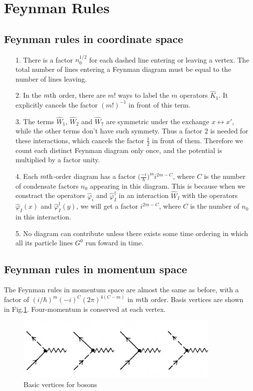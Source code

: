 \documentclass[12pt]{article}
\begin{document}
\noindent\hrulefill
\section{Feynman Rules}

\subsection*{Feynman rules in coordinate space}
\begin{itemize}
    \item[1.]There is a factor $n_0^{1/2}$ for each dashed line entering or leaving 
    a vertex. The total number of lines entering a Feynman diagram must be equal to 
    the number of lines leaving. 
    \item[2.]In the $m\rm th$ order, there are $m!$ ways to label the $m$ operators 
    $\hat{K}_1$. It explicitly cancels the factor $(m!)^{-1}$ in front of this term.
    \item[3.]The terms $\hat{W}_1$, $\hat{W}_2$ and $\hat{W}_7$ are symmetric under the 
    exchange $x\leftrightarrow x'$, while the other terms don't have such symmety. 
    Thus a factor $2$ is needed for these interactions, which cancels the factor 
    $\frac{1}{2}$ in front of them. Therefore we count each distinct Feynman diagram 
    only once, and the potential is multiplied by a factor unity.
    \item[4.]Each $m\rm th$-order diagram has a factor 
    $\big(\frac{-i}{\hbar}\big)^mi^{2m-C}$, where $C$ is the number of condensate 
    factors $n_0$ appearing in this diagram. This is because when we constract the
    operators $\hat{\varphi}_i$ and $\hat{\varphi}^\dagger_I$ in an interaction 
    $\hat{W}_I$ with the operators $\hat{\varphi}_I(x)$ and 
    $\hat{\varphi}^\dagger_I(y)$, we will get a factor $i^{2m-C}$, where $C$ is the 
    number of $n_0$ in this interaction.
    \item[5.]No diagram can contribute unless there exists some time ordering in which 
    all its particle lines $G^0$ run foward in time.    
\end{itemize}
\subsection*{Feynman rules in momentum space}
The Feynman rules in momentum space are almost the same as before, with a factor of 
$(i/\hbar)^m(-i)^C(2\pi)^{4(C-m)}$ in $m\rm th$ order. Basis vertices are shown in 
Fig.\ref{img2}. Four-momentum is conserved at each vertex.
\begin{figure}[H]
    \centering
    \includegraphics[width=10cm]{p2.jpg}
    \renewcommand{\figurename}{Fig.}
    \caption{Basic vertices for bosons}
    \label{img2}
\end{figure}
\end{document}
